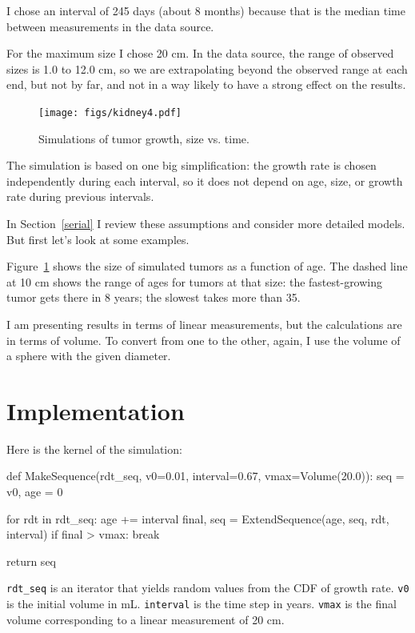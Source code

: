 \documentclass[12pt]{book}
\theoremstyle{exercise}
\newcommand{\py}[1]{{\tt #1}}%
\begin{document}
I chose an interval of 245 days (about 8 months) because that is the
median time between measurements in the data source.

For the maximum size I chose 20 cm.  In the data source, the range of
observed sizes is 1.0 to 12.0 cm, so we are extrapolating beyond
the observed range at each end, but not by far, and not in a way
likely to have a strong effect on the results.

\begin{figure}
\centerline{\texttt{[image: figs/kidney4.pdf]}}
\caption{Simulations of tumor growth, size vs. time.}
\label{fig.kidney4}
\end{figure}

The simulation is based on one big simplification:
the growth rate is chosen independently during each interval,
so it does not depend on age, size, or growth rate during
previous intervals.

In Section~\ref{serial} I review these assumptions and
consider more detailed models.  But first let's look at some
examples.

Figure~\ref{fig.kidney4} shows
the size of simulated tumors as a function of
age.  The dashed line at 10 cm shows the range of ages for tumors at
that size: the fastest-growing tumor gets there in 8 years; the
slowest takes more than 35.

I am presenting results in terms of linear measurements, but the
calculations are in terms of volume.  To convert from one to the
other, again, I use the volume of a sphere with the given
diameter.


\section{Implementation}

Here is the kernel of the simulation:

\begin{code}
def MakeSequence(rdt_seq, v0=0.01, interval=0.67, vmax=Volume(20.0)):
    seq = v0,
    age = 0

    for rdt in rdt_seq:
        age += interval
        final, seq = ExtendSequence(age, seq, rdt, interval)
        if final > vmax:
            break

    return seq
\end{code}

\verb"rdt_seq" is an iterator that yields
random values from the CDF of growth rate.
\py{v0} is the initial volume in mL.  \py{interval} is the time step
in years.  \py{vmax} is the final volume corresponding to a linear
measurement of 20 cm.
\end{document}
